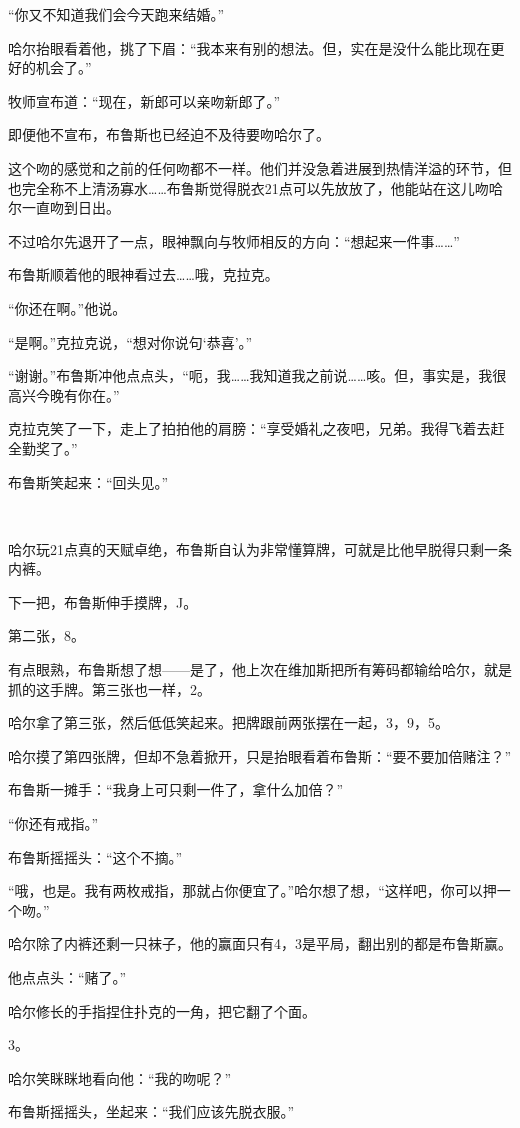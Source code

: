 \documentclass[../main]{subfiles}
\begin{document}
“你又不知道我们会今天跑来结婚。”

哈尔抬眼看着他，挑了下眉：“我本来有别的想法。但，实在是没什么能比现在更好的机会了。”

牧师宣布道：“现在，新郎可以亲吻新郎了。”

即便他不宣布，布鲁斯也已经迫不及待要吻哈尔了。

这个吻的感觉和之前的任何吻都不一样。他们并没急着进展到热情洋溢的环节，但也完全称不上清汤寡水……布鲁斯觉得脱衣21点可以先放放了，他能站在这儿吻哈尔一直吻到日出。

不过哈尔先退开了一点，眼神飘向与牧师相反的方向：“想起来一件事……”

布鲁斯顺着他的眼神看过去……哦，克拉克。

“你还在啊。”他说。

“是啊。”克拉克说，“想对你说句‘恭喜’。”

“谢谢。”布鲁斯冲他点点头，“呃，我……我知道我之前说……咳。但，事实是，我很高兴今晚有你在。”

克拉克笑了一下，走上了拍拍他的肩膀：“享受婚礼之夜吧，兄弟。我得飞着去赶全勤奖了。”

布鲁斯笑起来：“回头见。”

~\

哈尔玩21点真的天赋卓绝，布鲁斯自认为非常懂算牌，可就是比他早脱得只剩一条内裤。

下一把，布鲁斯伸手摸牌，J。

第二张，8。

有点眼熟，布鲁斯想了想——是了，他上次在维加斯把所有筹码都输给哈尔，就是抓的这手牌。第三张也一样，2。

哈尔拿了第三张，然后低低笑起来。把牌跟前两张摆在一起，3，9，5。

哈尔摸了第四张牌，但却不急着掀开，只是抬眼看着布鲁斯：“要不要加倍赌注？”

布鲁斯一摊手：“我身上可只剩一件了，拿什么加倍？”

“你还有戒指。”

布鲁斯摇摇头：“这个不摘。”

“哦，也是。我有两枚戒指，那就占你便宜了。”哈尔想了想，“这样吧，你可以押一个吻。”

哈尔除了内裤还剩一只袜子，他的赢面只有4，3是平局，翻出别的都是布鲁斯赢。

他点点头：“赌了。”

哈尔修长的手指捏住扑克的一角，把它翻了个面。

3。

哈尔笑眯眯地看向他：“我的吻呢？”

布鲁斯摇摇头，坐起来：“我们应该先脱衣服。”
\end{document}
